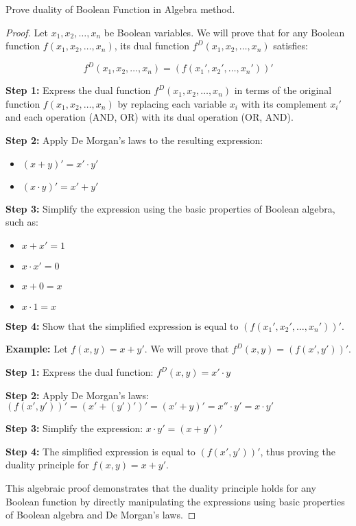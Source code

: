     \begin{exercise}
        Prove duality of Boolean Function in Algebra method.
    \end{exercise}
    \begin{proof}
        Let $x_1, x_2, \ldots, x_n$ be Boolean variables. We will prove that for any Boolean function $f(x_1, x_2, \ldots, x_n)$, its dual function $f^D(x_1, x_2, \ldots, x_n)$ satisfies:

		\[f^D(x_1, x_2, \ldots, x_n) = (f(x_1', x_2', \ldots, x_n'))'\]
		
		\textbf{Step 1:} Express the dual function $f^D(x_1, x_2, \ldots, x_n)$ in terms of the original function $f(x_1, x_2, \ldots, x_n)$ by replacing each variable $x_i$ with its complement $x_i'$ and each operation (AND, OR) with its dual operation (OR, AND).
		
		\textbf{Step 2:} Apply De Morgan's laws to the resulting expression:
		\begin{itemize}
		    \item $(x + y)' = x' \cdot y'$
		    \item $(x \cdot y)' = x' + y'$
		\end{itemize}
		
		\textbf{Step 3:} Simplify the expression using the basic properties of Boolean algebra, such as:
		\begin{itemize}
		    \item $x + x' = 1$
		    \item $x \cdot x' = 0$
		    \item $x + 0 = x$
		    \item $x \cdot 1 = x$
		\end{itemize}
		
		\textbf{Step 4:} Show that the simplified expression is equal to $(f(x_1', x_2', \ldots, x_n'))'$.
		
		\textbf{Example:}
		Let $f(x, y) = x + y'$. We will prove that $f^D(x, y) = (f(x', y'))'$.
		
		\textbf{Step 1:} Express the dual function:
		$f^D(x, y) = x' \cdot y$
		
		\textbf{Step 2:} Apply De Morgan's laws:
		$(f(x', y'))' = (x' + (y')')' = (x' + y)' = x'' \cdot y' = x \cdot y'$
		
		\textbf{Step 3:} Simplify the expression:
		$x \cdot y' = (x + y')'$
		
		\textbf{Step 4:} The simplified expression is equal to $(f(x', y'))'$, thus proving the duality principle for $f(x, y) = x + y'$.

		This algebraic proof demonstrates that the duality principle holds for any Boolean function by directly manipulating the expressions using basic properties of Boolean algebra and De Morgan's laws. 
    \end{proof}

